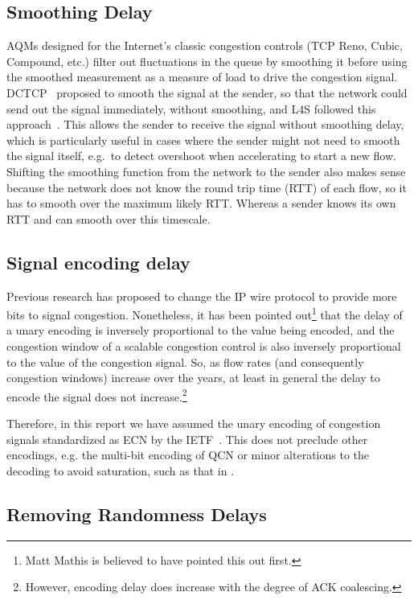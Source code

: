 \subsection{Smoothing Delay} AQMs designed for the Internet's classic congestion controls (TCP Reno, Cubic, Compound, etc.) filter out fluctuations in the queue by smoothing it before using the smoothed measurement as a measure of load to drive the congestion signal. DCTCP~\cite{Alizadeh10:DCTCP} proposed to smooth the signal at the sender, so that the network could send out the signal immediately, without smoothing, and L4S followed this approach~\cite{Briscoe16a:l4s-arch_ID}. This allows the sender to receive the signal without smoothing delay, which is particularly useful in cases where the sender might not need to smooth the signal itself, e.g.\ to detect overshoot when accelerating to start a new flow. Shifting the smoothing function from the network to the sender also makes sense because the network does not know the round trip time (RTT) of each flow, so it has to smooth over the maximum likely RTT. Whereas a sender knows its own RTT and can smooth over this timescale.

\subsection{Signal encoding delay} Previous research has proposed to change the IP wire protocol to provide more bits to signal congestion. Nonetheless, it has been pointed out\footnote{Matt Mathis is believed to have pointed this out first.} that the delay of a unary encoding is inversely proportional to the value being encoded, and the congestion window of a scalable congestion control is also inversely proportional to the value of the congestion signal. So, as flow rates (and consequently congestion windows) increase over the years, at least in general the delay to encode the signal does not increase.\footnote{However, encoding delay does increase with the degree of ACK coalescing.}

Therefore, in this report we have assumed the unary encoding of congestion signals standardized as ECN by the IETF~\cite{IETF_RFC3168:ECN_IP_TCP}. This does not preclude other encodings, e.g. the multi-bit encoding of QCN or minor alterations to the decoding to avoid saturation, such as that in \cite{Briscoe17a:CC_Tensions_TR}.

\subsection{Removing Randomness Delays}\label{sec:rand_delay}

